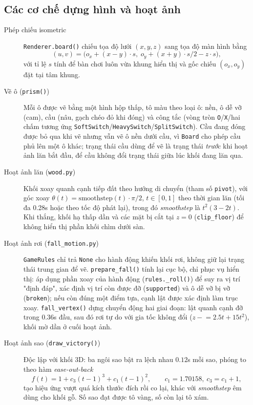 \subsection{Các cơ chế dựng hình và hoạt ảnh}
\label{sec:frontend_render}

\begin{description}
    \item[Phép chiếu isometric] \texttt{Renderer.board()} chiếu tọa độ
    lưới $(x,y,z)$ sang tọa độ màn hình bằng
    \[
        (u,v) = \big(o_x + (x-y)\cdot s,\; o_y + (x+y)\cdot s/2 - z\cdot s\big),
    \]
    với tỉ lệ $s$ tính để bàn chơi luôn vừa khung hiển thị và gốc chiếu
    $(o_x,o_y)$ đặt tại tâm khung.

    \item[Vẽ ô (\texttt{prism()})] Mỗi ô được vẽ bằng một hình hộp thấp,
    tô màu theo loại ô: nền, ô dễ vỡ (cam), cầu (nâu, gạch chéo đỏ khi
    đóng) và công tắc (vòng tròn \texttt{O}/\texttt{X}/hai chấm tương ứng
    \texttt{SoftSwitch}/\texttt{HeavySwitch}/\texttt{SplitSwitch}). Cầu
    đang đóng được bỏ qua khi vẽ nhưng vẫn vẽ ô nền dưới cầu, vì
    \texttt{Board} cho phép cầu phủ lên một ô khác; trạng thái cầu dùng
    để vẽ là trạng thái \textit{trước} khi hoạt ảnh lăn bắt đầu, để cầu
    không đổi trạng thái giữa lúc khối đang lăn qua.

    \item[Hoạt ảnh lăn (\texttt{wood.py})] Khối xoay quanh cạnh tiếp đất
    theo hướng di chuyển (tham số \texttt{pivot}), với góc xoay
    $\theta(t) = \mathrm{smoothstep}(t)\cdot\pi/2$, $t\in[0,1]$ theo thời
    gian lăn (tối đa 0.28s hoặc theo tốc độ phát lại), trong đó
    \textit{smoothstep} là $t^2(3-2t)$. Khi thắng, khối hạ thấp dần và
    các mặt bị cắt tại $z=0$ (\texttt{clip\_floor}) để không hiển thị
    phần khối chìm dưới sàn.

    \item[Hoạt ảnh rơi (\texttt{fall\_motion.py})] \texttt{GameRules} chỉ
    trả \texttt{None} cho hành động khiến khối rơi, không giữ lại trạng
    thái trung gian để vẽ. \texttt{prepare\_fall()} tính lại cục bộ, chỉ
    phục vụ hiển thị: áp dụng phần xoay của hành động
    (\texttt{rules.\_roll()}) để suy ra vị trí "định đáp", xác định vị
    trí còn được đỡ (\texttt{supported}) và ô dễ vỡ bị vỡ
    (\texttt{broken}); nếu còn đúng một điểm tựa, cạnh lật được xác định
    làm trục xoay. \texttt{fall\_vertex()} dựng chuyển động hai giai
    đoạn: lật quanh cạnh đỡ trong $0.36$s đầu, sau đó rơi tự do với gia
    tốc không đổi ($z \mathrel{-}= 2.5t + 15t^2$), khối mờ dần ở cuối
    hoạt ảnh.

    \item[Hoạt ảnh sao (\texttt{draw\_victory()})] Độc lập với khối 3D:
    ba ngôi sao bật ra lệch nhau $0.12$s mỗi sao, phóng to theo hàm
    \textit{ease-out-back}
    \[
        f(t) = 1 + c_3(t-1)^3 + c_1(t-1)^2, \qquad c_1 = 1.70158,\ c_3 = c_1+1,
    \]
    tạo hiệu ứng vượt quá kích thước đích rồi co lại, khác với
    \textit{smoothstep} êm dùng cho khối gỗ. Số sao đạt được tô vàng, số
    còn lại tô xám.
\end{description}

